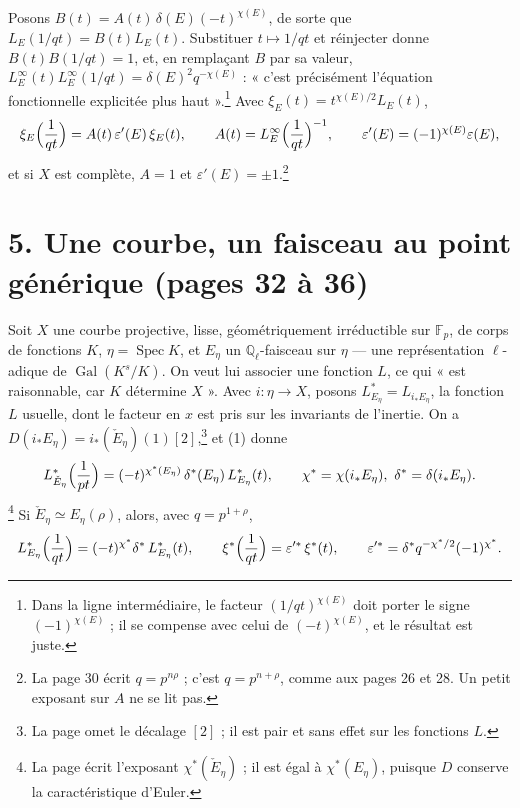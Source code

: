 \documentclass[11pt,a4paper]{article}
\begin{document}
Posons $B(t) = A(t)\,\delta(E)(-t)^{\chi(E)}$, de sorte que
$L_E(1/qt) = B(t)L_E(t)$. Substituer $t \mapsto 1/qt$ et réinjecter donne
$B(t)B(1/qt) = 1$, et, en remplaçant $B$ par sa valeur,
$L^{\infty}_E(t)L^{\infty}_E(1/qt) = \delta(E)^2q^{-\chi(E)}$ : « c'est
précisément l'équation fonctionnelle explicitée plus haut ».\footnote{Dans la
ligne intermédiaire, le facteur $(1/qt)^{\chi(E)}$ doit porter le signe
$(-1)^{\chi(E)}$ ; il se compense avec celui de $(-t)^{\chi(E)}$, et le
résultat est juste.} Avec $\xi_E(t) = t^{\chi(E)/2}L_E(t)$,
\[
  \xi_E\Bigl(\frac{1}{qt}\Bigr) = A(t)\,\varepsilon'(E)\,\xi_E(t),
  \qquad A(t) = L^{\infty}_E\Bigl(\frac{1}{qt}\Bigr)^{-1},
  \qquad \varepsilon'(E) = (-1)^{\chi(E)}\varepsilon(E),
\]
et si $X$ est complète, $A = 1$ et $\varepsilon'(E) = \pm 1$.\footnote{La page 30
écrit $q = p^{n\rho}$ ; c'est $q = p^{n+\rho}$, comme aux pages 26 et 28. Un
petit exposant sur $A$ ne se lit pas.}

\section*{5. Une courbe, un faisceau au point générique (pages 32 à 36)}

Soit $X$ une courbe projective, lisse, géométriquement irréductible sur
$\mathbb{F}_p$, de corps de fonctions $K$, $\eta = \operatorname{Spec}K$, et
$E_\eta$ un $\mathbb{Q}_\ell$-faisceau sur $\eta$ --- une représentation
$\ell$-adique de $\operatorname{Gal}(K^{s}/K)$. On veut lui associer une
fonction $L$, ce qui « est raisonnable, car $K$ détermine $X$ ». Avec
$i : \eta \to X$, posons $L^{*}_{E_\eta} = L_{i_{*}E_\eta}$, la fonction $L$
usuelle, dont le facteur en $x$ est pris sur les invariants de l'inertie.
On a $D(i_{*}E_\eta) = i_{*}(\check E_\eta)(1)[2]$,\footnote{La page omet le
décalage $[2]$ ; il est pair et sans effet sur les fonctions $L$.} et (1)
donne
\[
  L^{*}_{\check E_\eta}\Bigl(\frac{1}{pt}\Bigr)
  = (-t)^{\chi^{*}(E_\eta)}\,\delta^{*}(E_\eta)\,L^{*}_{E_\eta}(t),
  \qquad \chi^{*} = \chi(i_{*}E_\eta),\ \delta^{*} = \delta(i_{*}E_\eta).
\]
\footnote{La page écrit l'exposant $\chi^{*}(\check E_\eta)$ ; il est égal à
$\chi^{*}(E_\eta)$, puisque $D$ conserve la caractéristique d'Euler.} Si
$\check E_\eta \simeq E_\eta(\rho)$, alors, avec $q = p^{1+\rho}$,
\[
  L^{*}_{E_\eta}\Bigl(\frac{1}{qt}\Bigr)
  = (-t)^{\chi^{*}}\delta^{*}\,L^{*}_{E_\eta}(t), \qquad
  \xi^{*}\Bigl(\frac{1}{qt}\Bigr) = \varepsilon'^{*}\,\xi^{*}(t), \qquad
  \varepsilon'^{*} = \delta^{*}q^{-\chi^{*}/2}(-1)^{\chi^{*}} .
\]
\end{document}
